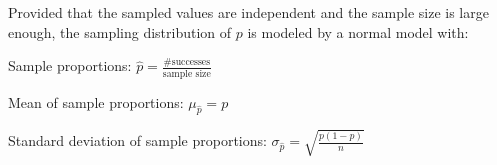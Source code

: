 \documentclass[../stats.tex]{subfiles}
\begin{document}
Provided that the sampled values are independent and the sample size is large enough, the sampling distribution of $p$ is modeled by a normal model with:

Sample proportions: $\hat{p}=\frac{\#\text{successes}}{\text{sample size}}$

Mean of sample proportions: $\mu_{\hat{p}}=p$

Standard deviation of sample proportions: $\sigma_{\hat{p}}=\sqrt{\frac{p(1-p)}{n}}$
\end{document}

